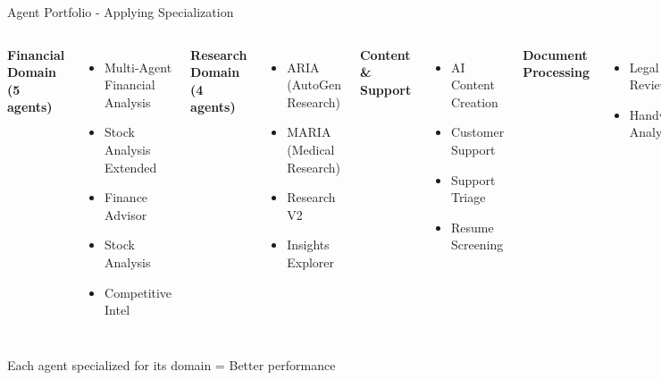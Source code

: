 \documentclass[aspectratio=169,11pt]{beamer}
\begin{document}
\begin{frame}{Agent Portfolio - Applying Specialization}
\begin{columns}
\textbf{Financial Domain (5 agents)}
\begin{itemize}
    \item Multi-Agent Financial Analysis
    \item Stock Analysis Extended
    \item Finance Advisor
    \item Stock Analysis
    \item Competitive Intel
\end{itemize}

\textbf{Research Domain (4 agents)}
\begin{itemize}
    \item ARIA (AutoGen Research)
    \item MARIA (Medical Research)
    \item Research V2
    \item Insights Explorer
\end{itemize}

\textbf{Content \& Support}
\begin{itemize}
    \item AI Content Creation
    \item Customer Support
    \item Support Triage
    \item Resume Screening
\end{itemize}

\textbf{Document Processing}
\begin{itemize}
    \item Legal Review
    \item Handwriting Analysis
\end{itemize}
\end{columns}

\vspace{0.3cm}
\begin{center}
\colorbox{blue!20}{Each agent specialized for its domain = Better performance}
\end{center}
\end{frame}
\end{document}
